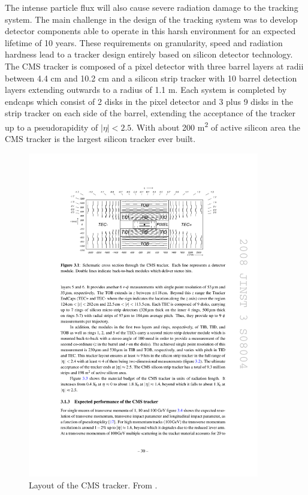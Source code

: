 The intense particle flux will also cause severe radiation damage to the tracking system.
The main challenge in the design of the tracking system was to develop detector components able
to operate in this harsh environment for an expected lifetime of 10 years. These requirements on
granularity, speed and radiation hardness lead to a tracker design entirely based on silicon detector
technology. The CMS tracker is composed of a pixel detector with three barrel layers at radii
between 4.4 cm and 10.2 cm and a silicon strip tracker with 10 barrel detection layers extending
outwards to a radius of 1.1 m. Each system is completed by endcaps which consist of 2 disks in
the pixel detector and 3 plus 9 disks in the strip tracker on each side of the barrel, extending the
acceptance of the tracker up to a pseudorapidity of $|\eta| < 2.5$. With about 200 m\textsuperscript{2} of active silicon
area the CMS tracker is the largest silicon tracker ever built.

\begin{figure}[hbtp]
\centering
\includegraphics[width=0.9\textwidth]{figures/cms_tracker.pdf}
\caption{Layout of the CMS tracker. From \cite{Chatrchyan:2008aa}.}
\label{fig:cms_tracker}
\end{figure}

